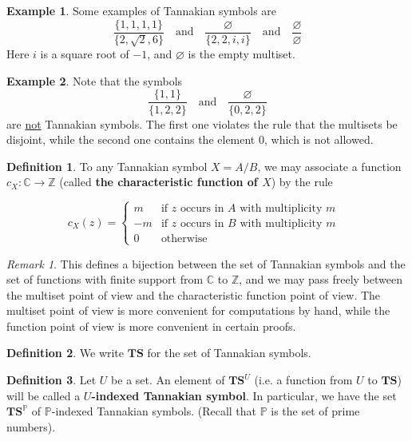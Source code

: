 \documentclass[a4paper]{article}
\theoremstyle{definition}
\newtheorem{definition}{Definition}[section]
\newtheorem{example}{Example}[section]
\theoremstyle{remark}
\newtheorem*{remark}{Remark}
\newcommand{\Z}{\mathbb{Z}}
\newcommand{\C}{\mathbb{C}}
\newcommand{\TS}{\mathbf{TS}}
\newcommand{\defhl}[1]{\textbf{#1}}
\newcommand{\threepartdef}[6]
{
	\left\{
		\begin{array}{lll}
			#1 & \mbox{if } #2 \\
			#3 & \mbox{if } #4 \\
			#5 & \mbox{} #6
		\end{array}
	\right.
}
\begin{document}
\begin{example}
Some examples of Tannakian symbols are 
$$    \frac{   \{  1,1, 1, 1  \}   }{  \{  2, \sqrt{2}, 6  \}   } \quad \textrm{and} \quad   \frac{   \varnothing   }{  \{  2, 2, i, i  \}   }   \quad \textrm{and} \quad  \frac{  \varnothing  }{     \varnothing }    $$
Here $i$ is a square root of $-1$, and $\varnothing$ is the empty multiset.
\end{example}

\begin{example}
Note that the symbols 
$$    \frac{   \{  1, 1  \}   }{  \{  1, 2, 2  \}   } \quad \textrm{and} \quad   \frac{   \varnothing   }{  \{  0, 2, 2  \}   }      $$
are \underline{not} Tannakian symbols. The first one violates the rule that the multisets be disjoint, while the second one contains the element $0$, which is not allowed.
\end{example}

\begin{definition}
To any Tannakian symbol $X = A/B$, we may associate a function $c_X : \C \to \Z$ (called \defhl{the characteristic function of $X$})  by the rule

$$  c_X(z) = \threepartdef { m } {z \textrm{ occurs in $A$ with multiplicity $m$} } {  -m }  { z \textrm{ occurs in $B$ with multiplicity $m$  } }  {0} {\textrm{otherwise}}   $$
\end{definition}
\begin{remark}

This defines a bijection between the set of Tannakian symbols and the set of functions with finite support from $\C$ to $\Z$, and we may pass freely between the multiset point of view and the characteristic function point of view. The multiset point of view is more convenient for computations by hand, while the function point of view is more convenient in certain proofs. 
\end{remark}

\begin{definition}
We write $\TS$ for the set of Tannakian symbols.
\end{definition}

\begin{definition}
Let $U$ be a set. An element of $\TS^U$ (i.e. a function from $U$ to $\TS$) will be called a \defhl{$U$-indexed Tannakian symbol}. In particular, we have the set $\TS^{\mathbb{P}}$ of $\mathbb{P}$-indexed Tannakian symbols. (Recall that $\mathbb{P}$ is the set of prime numbers).
\end{definition}
\end{document}
